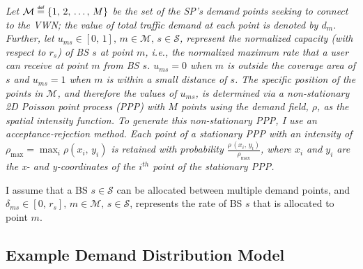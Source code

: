 \documentclass[12pt,dvipsnames]{report}
\newcommand\defeq{\mathrel{\overset{\makebox[0pt]{\mbox{\normalfont\tiny\sffamily def}}}{=}}}
\begin{document}
%
\textit{Let $\mathcal{M} \defeq \{1,\, 2,\, \ldots,\, M\}$ be the set of the SP's demand points seeking to connect to the VWN; the value of total traffic demand at each point is denoted by $d_m$.  Further, let $u_{ms} \in [0,\, 1],\, m \in \mathcal{M},\, s \in \mathcal{S}$, represent the normalized capacity (with respect to $r_s$) of BS $s$ at point $m$, i.e., the normalized maximum rate that a user can receive at point $m$ from BS $s$.  $u_{ms} = 0$ when $m$ is outside the coverage area of $s$ and $u_{ms} = 1$ when $m$ is within a small distance of $s$.  The specific position of the points in $\mathcal{M}$, and therefore the values of $u_{ms}$, is determined via a non-stationary 2D Poisson point process (PPP) with $M$ points using the demand field, $\rho$, as the spatial intensity function.  To generate this non-stationary PPP, I use an acceptance-rejection method.  Each point of a stationary PPP with an intensity of $\rho_{\max} = \max_i\rho\left(x_i,\, y_i\right)$ is retained with probability $\frac{\rho\,\left(x_i,\, y_i\right)}{\rho_{\max}}$, where $x_i$ and $y_i$ are the x- and y-coordinates of the $i^{th}$ point of the stationary PPP.}

I assume that a BS $s \in \mathcal{S}$ can be allocated between multiple demand points, and $\delta_{ms} \in [0,\, r_s],\, m \in \mathcal{M},\, s \in \mathcal{S}$, represents the rate of BS $s$ that is allocated to point $m$.

\subsection{Example Demand Distribution Model} \label{subsec:networkdefs_sslt}
\end{document}
